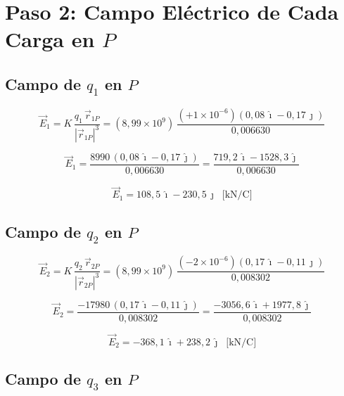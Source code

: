 \documentclass[12pt,letterpaper]{article}
\begin{document}
\section*{Paso 2: Campo El\'ectrico de Cada Carga en $P$}

\subsection*{Campo de $q_1$ en $P$}

\begin{equation*}
\vec{E}_1 = K\,\frac{q_1\,\vec{r}_{1P}}{|\vec{r}_{1P}|^3}
= (8{,}99\times10^9)\,\frac{(+1\times10^{-6})(0{,}08\,\hat{\imath} - 0{,}17\,\hat{\jmath})}{0{,}006630}
\end{equation*}

\begin{equation*}
\vec{E}_1 = \frac{8990\,(0{,}08\,\hat{\imath} - 0{,}17\,\hat{\jmath})}{0{,}006630}
= \frac{719{,}2\,\hat{\imath} - 1528{,}3\,\hat{\jmath}}{0{,}006630}
\end{equation*}

\begin{equation*}
\boxed{\vec{E}_1 = 108{,}5\,\hat{\imath} - 230{,}5\,\hat{\jmath} \;\;\text{[kN/C]}}
\end{equation*}

\subsection*{Campo de $q_2$ en $P$}

\begin{equation*}
\vec{E}_2 = K\,\frac{q_2\,\vec{r}_{2P}}{|\vec{r}_{2P}|^3}
= (8{,}99\times10^9)\,\frac{(-2\times10^{-6})(0{,}17\,\hat{\imath} - 0{,}11\,\hat{\jmath})}{0{,}008302}
\end{equation*}

\begin{equation*}
\vec{E}_2 = \frac{-17980\,(0{,}17\,\hat{\imath} - 0{,}11\,\hat{\jmath})}{0{,}008302}
= \frac{-3056{,}6\,\hat{\imath} + 1977{,}8\,\hat{\jmath}}{0{,}008302}
\end{equation*}

\begin{equation*}
\boxed{\vec{E}_2 = -368{,}1\,\hat{\imath} + 238{,}2\,\hat{\jmath} \;\;\text{[kN/C]}}
\end{equation*}

\subsection*{Campo de $q_3$ en $P$}
\end{document}

